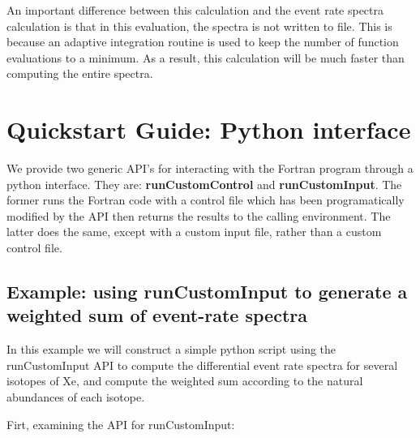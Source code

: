 \documentclass[12pt]{article}
\begin{document}
An important difference between this calculation and the event rate spectra
calculation is that in this evaluation, the spectra is not written to file. This
is because an adaptive integration routine is used to keep the number of
function evaluations to a minimum. As a result, this calculation will be much
faster than computing the entire spectra.

\clearpage

\section{Quickstart Guide: Python interface}

We provide two generic API's for interacting with the Fortran program through a
python interface. They are: \textbf{runCustomControl} and
\textbf{runCustomInput}. The former runs the Fortran code with a control file
which has been programatically modified by the API then returns the results to
the calling environment. The latter does the same, except with a custom input
file, rather than a custom control file.

\subsection{Example: using runCustomInput to generate a weighted sum of
event-rate spectra}

In this example we will construct a simple python script using the 
runCustomInput API to compute the differential
event rate spectra for several isotopes of Xe, and compute the weighted sum
according to the natural abundances of each isotope.

Firt, examining the API for runCustomInput:
\end{document}
